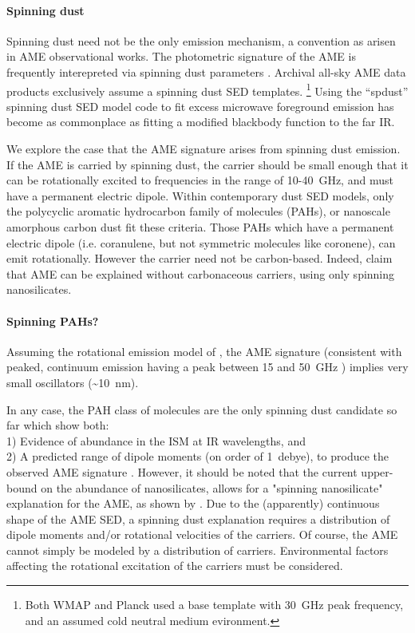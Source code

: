     \paragraph{Spinning dust}
     Spinning dust need not be the only emission mechanism, a convention as arisen in AME observational works. The photometric signature of the AME is frequently interepreted via spinning dust parameters \citep{ysard11,ali-haimoud10}. Archival all-sky AME data products exclusively assume a spinning dust SED templates.   \footnote{Both WMAP and Planck used a base template with 30~GHz peak frequency, and an assumed cold neutral medium evironment.} Using the ``spdust'' spinning dust SED model code to fit excess microwave foreground emission has become as commonplace as fitting a modified blackbody function to the far IR.

      We explore the case that the AME signature arises from spinning dust emission. If the AME is carried by spinning dust, the carrier should be small enough that it can be rotationally excited to frequencies in the range of 10-40~GHz, and must have a permanent electric dipole. Within contemporary dust SED models, only the polycyclic aromatic hydrocarbon family of molecules (PAHs), or nanoscale amorphous carbon dust fit these criteria. Those PAHs which have a permanent electric dipole (i.e. coranulene, but not symmetric molecules like coronene), can emit rotationally. However the carrier need not be carbon-based. Indeed, \cite{hensley17a} claim that AME can be explained without carbonaceous carriers, using only spinning nanosilicates.

     \paragraph{Spinning PAHs?}
       Assuming the rotational emission model of \cite{draine98b}, the AME signature (consistent with peaked, continuum emission having a peak between 15 and 50~GHz ) implies very small oscillators (\textasciitilde{}10~nm).

       In any case, the PAH class of molecules are the only spinning dust candidate so far which show both: \\
       1) Evidence of abundance in the ISM at IR wavelengths, and \\
       2) A predicted range of dipole moments (on order of 1~debye), to produce the observed AME signature \citep{draine98b, lovas05, thorwirth07}. However, it should be noted that the current upper-bound on the abundance of nanosilicates, allows for a "spinning nanosilicate" explanation for the AME, as shown by \cite{hensley17a}. Due to the (apparently) continuous shape of the AME SED, a spinning dust explanation requires a distribution of dipole moments and/or rotational velocities of the carriers. Of course, the AME cannot simply be modeled by a distribution of carriers. Environmental factors affecting the rotational excitation of the carriers must be considered.

